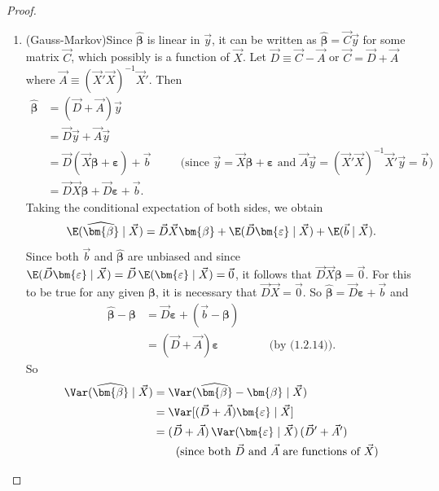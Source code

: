 \begin{proof}
\begin{enumerate}[label=(\alph*)]
\item (Gauss-Markov)\quad Since $\widehat{\bm{\beta}}$ is linear in $\vec{y}$, it can
  be written as $\widehat{\bm{\beta}} = \vec{C}\vec{y}$ for some matrix $\vec{C}$,
  which possibly is a function of $\vec{X}$.  Let
  $\vec{D} \equiv \vec{C} - \vec{A}$ or $\vec{C} = \vec{D} + \vec{A}$ where
  $\vec{A} \equiv (\vec{X}'\vec{X})^{-1}\vec{X}'$.  Then
  \begin{align*}
    \widehat{\bm{\beta}}
      &= (\vec{D} + \vec{A})\vec{y} \\
      &= \vec{D}\vec{y} + \vec{A}\vec{y} \\
      &= \vec{D}(\vec{X}\bm{\beta} + \bm{\varepsilon}) + \vec{b}
        &\quad&\text{(since $\vec{y} = \vec{X}\bm{\beta} + \bm{\varepsilon}$ and
        $\vec{A}\vec{y} = (\vec{X}'\vec{X})^{-1}\vec{X}'\vec{y} = \vec{b}$)} \\
      &= \vec{D}\vec{X}\bm{\beta} + \vec{D}\bm{\varepsilon} + \vec{b}.
  \end{align*}
  Taking the conditional expectation of both sides, we obtain
  \[
    \E(\widehat{\bm{\beta}} \mid \vec{X})
      = \vec{D}\vec{X}\bm{\beta}
        + \E(\vec{D}\bm{\varepsilon} \mid \vec{X})
        + \E(\vec{b} \mid \vec{X}).
  \]
  Since both $\vec{b}$ and $\widehat{\bm{\beta}}$ are unbiased and since
  $\E(\vec{D}\bm{\varepsilon} \mid \vec{X})
    = \vec{D}\,\E(\bm{\varepsilon} \mid \vec{X}) = \vec{0}$,
  it follows that $\vec{D}\vec{X}\bm{\beta} = \vec{0}$.  For this to be true for any
  given $\bm{\beta}$, it is necessary that $\vec{D}\vec{X} = \vec{0}$.  So
  $\widehat{\bm{\beta}} = \vec{D}\bm{\varepsilon} + \vec{b}$ and
  \begin{align*}
    \widehat{\bm{\beta}} - \bm{\beta}
      &= \vec{D}\bm{\varepsilon} + (\vec{b} - \bm{\beta}) \\
      &= (\vec{D} + \vec{A})\bm{\varepsilon}
        &\quad&\text{(by (1.2.14)).}
  \end{align*}
  So
  \begin{align*}
    \Var(\widehat{\bm{\beta}} \mid \vec{X})
      &= \Var(\widehat{\bm{\beta}} - \bm{\beta} \mid \vec{X}) \\
      &= \Var[(\vec{D} + \vec{A})\bm{\varepsilon} \mid \vec{X}] \\
      &= (\vec{D} + \vec{A})\,\Var(\bm{\varepsilon} \mid \vec{X})\,
         (\vec{D}' + \vec{A}') \\
      &\qquad\text{(since both $\vec{D}$ and $\vec{A}$ are functions of $\vec{X}$)} \\

\end{align*}
\end{enumerate}
\end{proof}
